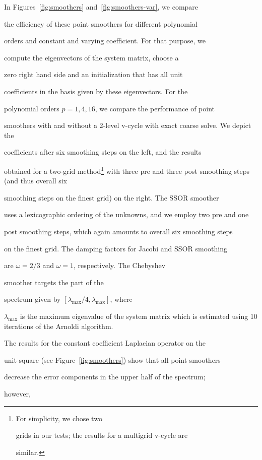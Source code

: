 \documentclass[smallcondensed,final]{svjour3}     %
\begin{document}
In Figures~\ref{fig:smoothers} and~\ref{fig:smoothers-var}, we compare

the efficiency of these point smoothers for different polynomial

orders and constant and varying coefficient. For that purpose, we

compute the eigenvectors of the system matrix, choose a

zero right hand side and an initialization that has all unit

coefficients in the basis given by these eigenvectors. For the

polynomial orders $p=1,4,16$, we compare the performance of point

smoothers with and without a 2-level v-cycle with exact coarse solve. We depict the

coefficients after six smoothing steps on the left, and the results

obtained for a two-grid method\footnote{For simplicity, we chose two

  grids in our tests; the results for a multigrid v-cycle are

  similar.} with three pre and three post smoothing steps (and thus overall six

smoothing steps on the finest grid) on the right. The SSOR smoother

uses a lexicographic ordering of the unknowns, and we employ two pre and one

post smoothing steps, which again amounts to overall six smoothing steps

on the finest grid. The damping factors for Jacobi and SSOR smoothing

are $\omega = 2/3$ and $\omega=1$, respectively. The Chebyshev

smoother targets the part of the

spectrum given by $[\lambda_\text{max}/4,\lambda_\text{max}]$, where

$\lambda_\text{max}$ is the maximum eigenvalue of the system matrix which is estimated using 10 iterations of the Arnoldi algorithm.



The results for the constant coefficient Laplacian operator on the

unit square (see Figure~\ref{fig:smoothers}) show that all point smoothers

decrease the error components in the upper half of the spectrum;

however,
\end{document}
